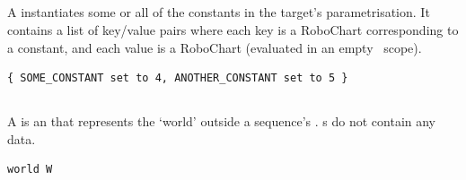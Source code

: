 \subsection{\mtargetinstantiation}

A \mtargetinstantiation{} instantiates some or all of the constants in the
target's parametrisation.  It contains a list of key/value pairs where each key
is a RoboChart \mvariable{} corresponding to a constant, and each value is a
RoboChart \mexpression{} (evaluated in an empty~ scope).

\begin{lstlisting}[style=Example]
{ SOME_CONSTANT set to 4, ANOTHER_CONSTANT set to 5 }
\end{lstlisting}

\subsection{\mworld}\label{ssec:metamodel-actors-world}

A \mworld{} is an \mactor{} that represents the `world' outside a sequence's
\mtarget.  \mworld s do not contain any data.

\begin{lstlisting}[style=Example]
world W
\end{lstlisting}

